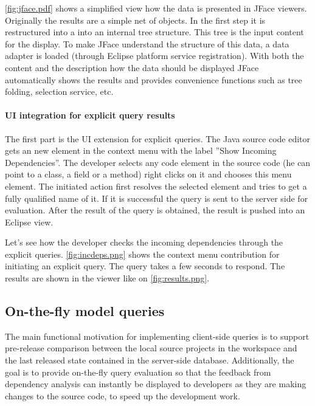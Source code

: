 \autoref{fig:jface.pdf} shows a simplified view how the data is presented in
JFace viewers. Originally the results are a simple net of objects. In the first
step it is restructured into a into an internal tree structure. This tree is the
input content for the display. To make JFace understand  the structure of this
data, a data adapter is loaded (through Eclipse platform service registration).
With both the content and the description how the data should be displayed JFace
automatically shows the results and provides convenience functions such as tree
folding, selection service, etc. 

\paragraph{UI integration for explicit query results} 
The first part is the UI extension for explicit queries. The Java source code
editor gets an new element in the context menu with the label ''Show Incoming
Dependencies''. The developer selects any code element in the source code (he
can point to a class, a field or a method) right clicks on it and chooses this
menu element. The initiated action first resolves the selected element and tries
to get a fully qualified name of it. If it is successful the query is sent to
the server side for evaluation. After the result of the query is obtained, the 
result is pushed into an Eclipse view.

Let's see how the developer checks the incoming dependencies through the
explicit queries.
\autoref{fig:incdeps.png} shows the context menu contribution for initiating an
explicit query. The query takes a few seconds to respond. The results are shown
in the viewer like on \autoref{fig:results.png}.


\subsection{On-the-fly model queries}

The main functional motivation for implementing client-side queries is to
support pre-release comparison between the local source projects in the
workspace and the last released state contained in the server-side database.
Additionally, the goal is to provide on-the-fly query evaluation so that the
feedback from dependency analysis can instantly be displayed to developers as
they are making changes to the source code, to speed up the development work.

